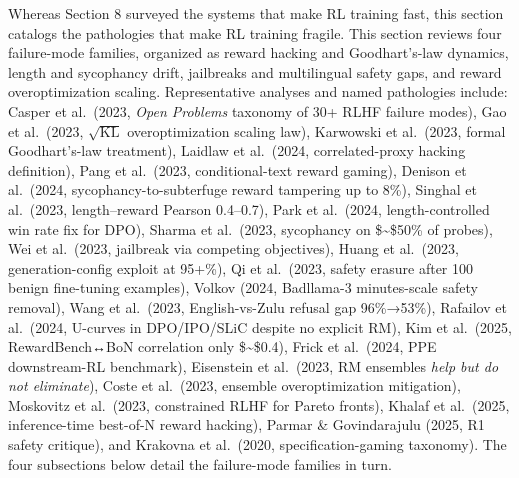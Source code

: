 Whereas Section 8 surveyed the systems that make RL training fast, this section catalogs the pathologies that make RL training fragile. This section reviews four failure-mode families, organized as reward hacking and Goodhart's-law dynamics, length and sycophancy drift, jailbreaks and multilingual safety gaps, and reward overoptimization scaling. Representative analyses and named pathologies include: Casper et al.~(2023, \emph{Open Problems} taxonomy of 30+ RLHF failure modes), Gao et al.~(2023, \(\sqrt{\mathrm{KL}}\) overoptimization scaling law), Karwowski et al.~(2023, formal Goodhart's-law treatment), Laidlaw et al.~(2024, correlated-proxy hacking definition), Pang et al.~(2023, conditional-text reward gaming), Denison et al.~(2024, sycophancy-to-subterfuge reward tampering up to 8\%), Singhal et al.~(2023, length--reward Pearson 0.4--0.7), Park et al.~(2024, length-controlled win rate fix for DPO), Sharma et al.~(2023, sycophancy on \$\sim\$50\% of probes), Wei et al.~(2023, jailbreak via competing objectives), Huang et al.~(2023, generation-config exploit at 95+\%), Qi et al.~(2023, safety erasure after 100 benign fine-tuning examples), Volkov (2024, Badllama-3 minutes-scale safety removal), Wang et al.~(2023, English-vs-Zulu refusal gap 96\%→53\%), Rafailov et al.~(2024, U-curves in DPO/IPO/SLiC despite no explicit RM), Kim et al.~(2025, RewardBench↔BoN correlation only \$\sim\$0.4), Frick et al.~(2024, PPE downstream-RL benchmark), Eisenstein et al.~(2023, RM ensembles \emph{help but do not eliminate}), Coste et al.~(2023, ensemble overoptimization mitigation), Moskovitz et al.~(2023, constrained RLHF for Pareto fronts), Khalaf et al.~(2025, inference-time best-of-N reward hacking), Parmar \& Govindarajulu (2025, R1 safety critique), and Krakovna et al.~(2020, specification-gaming taxonomy). The four subsections below detail the failure-mode families in turn.

